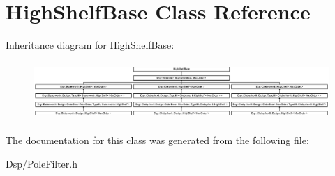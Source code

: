 \hypertarget{classHighShelfBase}{\section{High\-Shelf\-Base Class Reference}
\label{classHighShelfBase}
}
Inheritance diagram for High\-Shelf\-Base\-:\begin{figure}[H]
\begin{center}
\leavevmode
\includegraphics[height=2.244489cm]{classHighShelfBase}
\end{center}
\end{figure}


The documentation for this class was generated from the following file\-:\begin{DoxyCompactItemize}
\item 
Dsp/Pole\-Filter.\-h\end{DoxyCompactItemize}
